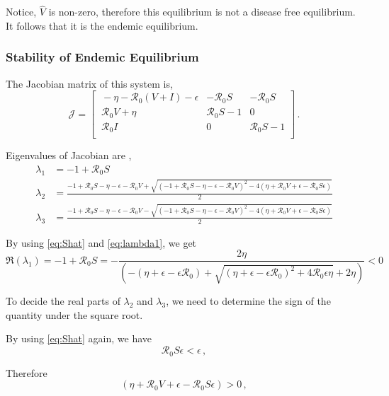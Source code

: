 \documentclass[12pt]{article}
\newcommand{\R}{\mathcal{R}}
\begin{document}
Notice, $\hat{V}$ is non-zero, therefore this equilibrium is not a disease free equilibrium. It follows that it is the endemic equilibrium.

\subsubsection{Stability of Endemic Equilibrium}

The Jacobian matrix of this system is,
\begin{equation}
\mathcal{J} =
\begin{bmatrix}
    \ -\eta-\R_0 (V+I)-\epsilon       & -\R_0 S     &-\R_0 S\\
    \ \R_0 V+\eta       & \R_0 S-1    &0\\
    \ \R_0 I       &0     &\R_0 S-1\\
\end{bmatrix}\,.
\end{equation}

Eigenvalues of Jacobian are ,
\begin{subequations}
\begin{align}
\lambda_1&=-1+\R_0 S \label{eq:lambda1}\\
\lambda_2&=\frac{-1+\R_0 S-\eta-\epsilon-\R_0 V+\sqrt{(-1+\R_0 S-\eta-\epsilon-\R_0 V)^2-4(\eta+\R_0 V+\epsilon-\R_0 S\epsilon)}}{2}\\
\lambda_3&=\frac{-1+\R_0 S-\eta-\epsilon-\R_0 V-\sqrt{(-1+\R_0 S-\eta-\epsilon-\R_0 V)^2-4(\eta+\R_0 V+\epsilon-\R_0 S\epsilon)}}{2}
\end{align}
\end{subequations}

By using \autoref{eq:Shat} and \autoref{eq:lambda1}, we get
\begin{equation}
\Re(\lambda_1)=-1+\R_0 S=-\frac{2\eta}{(-(\eta+\epsilon-\epsilon\R_0)+\sqrt{(\eta+\epsilon-\epsilon\R_0)^2+4\R_0\epsilon \eta}+2\eta)}<0
\end{equation}

To decide the real parts of $\lambda_2$ and $\lambda_3$, we need to determine the sign of the quantity under the square root.

By using \autoref{eq:Shat} again, we have
\begin{equation}
\R_0 S\epsilon<\epsilon\,,
\end{equation}

Therefore
\begin{equation}
(\eta+\R_0 V+\epsilon-\R_0 S\epsilon)>0\,,
\end{equation}
\end{document}

